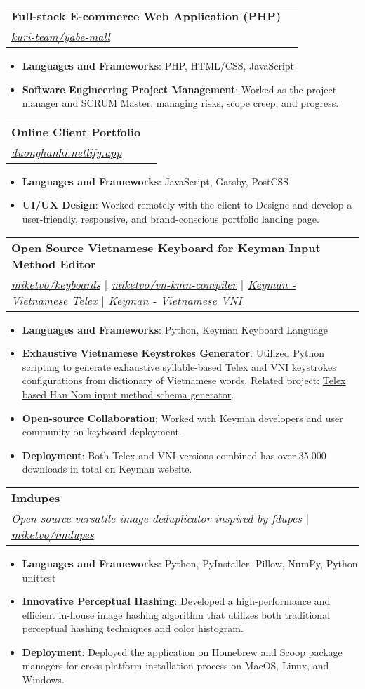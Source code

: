\documentclass[a4paper,11pt]{article}
\makeatletter
\newcommand{\resumeItem}[2]{
  \item\small{
    \textbf{#1}{: #2 \vspace{-2pt}}
  }
}
\newcommand{\resumeSubheading}[4]{
  \vspace{-2pt}\item
    \begin{tabular*}{0.97\textwidth}{l@{\extracolsep{\fill}}r}
      \textbf{#1} & #2 \\
      \textit{\small#3} & \textit{\small #4} \\
    \end{tabular*}\vspace{-6pt}
}
\newcommand{\resumeItemListStart}{\begin{itemize}}
\newcommand{\resumeItemListEnd}{\end{itemize}\vspace{-6pt}}
\makeatother
\begin{document}
  \resumeSubheading
    {Full-stack E-commerce Web Application (PHP)}{}
    {\href{https://github.com/kuri-team/yabe-mall}{\faGithub\space kuri-team/yabe-mall}}{}
    \resumeItemListStart
      \resumeItem{Languages and Frameworks}
        {PHP, HTML/CSS, JavaScript}
      \resumeItem{Software Engineering Project Management}
        {Worked as the project manager and SCRUM Master, managing risks, scope creep, and progress.}
    \resumeItemListEnd

    \resumeSubheading
      {Online Client Portfolio}{}
      {\href{https://duonghanhi.netlify.app/}{\faGlobe\space duonghanhi.netlify.app}}{}
      \resumeItemListStart
        \resumeItem{Languages and Frameworks}
          {JavaScript, Gatsby, PostCSS}
        \resumeItem{UI/UX Design}
          {Worked remotely with the client to Designe and develop a user-friendly, responsive, and brand-conscious portfolio landing page.}
      \resumeItemListEnd

    \resumeSubheading
      {Open Source Vietnamese Keyboard for Keyman Input Method Editor}{}
      {\href{https://github.com/miketvo/keyboards}{\faGithub\space miketvo/keyboards} $|$ \href{https://github.com/miketvo/vn-kmn-compiler}{\faGithub\space miketvo/vn-kmn-compiler} $|$ \href{https://keyman.com/keyboards/vietnamese_telex}{\faGlobe\space Keyman - Vietnamese Telex} $|$ \href{https://keyman.com/keyboards/vietnamese_vni}{\faGlobe\space Keyman - Vietnamese VNI}}{}
      \resumeItemListStart
        \resumeItem{Languages and Frameworks}
          {Python, Keyman Keyboard Language}
        \resumeItem{Exhaustive Vietnamese Keystrokes Generator}
          {Utilized Python scripting to generate exhaustive syllable-based Telex and VNI keystrokes configurations from dictionary of Vietnamese words. Related project: \href{https://github.com/miketvo/rime-ime-han-nom-data}{\faGithub\space Telex based Han Nom input method schema generator}.}
        \resumeItem{Open-source Collaboration}
          {Worked with Keyman developers and user community on keyboard deployment.}
        \resumeItem{Deployment}
          {Both Telex and VNI versions combined has over 35.000 downloads in total on Keyman website.}
      \resumeItemListEnd

    \resumeSubheading
      {Imdupes}{}
      {Open-source versatile image deduplicator inspired by fdupes $|$ \href{https://github.com/miketvo/imdupes}{\faGithub\space miketvo/imdupes}}{}
      \resumeItemListStart
        \resumeItem{Languages and Frameworks}
          {Python, PyInstaller, Pillow, NumPy, Python unittest}
        \resumeItem{Innovative Perceptual Hashing}
          {Developed a high-performance and efficient in-house image hashing algorithm that utilizes both traditional perceptual hashing techniques and color histogram.}
        \resumeItem{Deployment}
          {Deployed the application on Homebrew and Scoop package managers for cross-platform installation process on MacOS, Linux, and Windows.}
      \resumeItemListEnd
\end{document}
